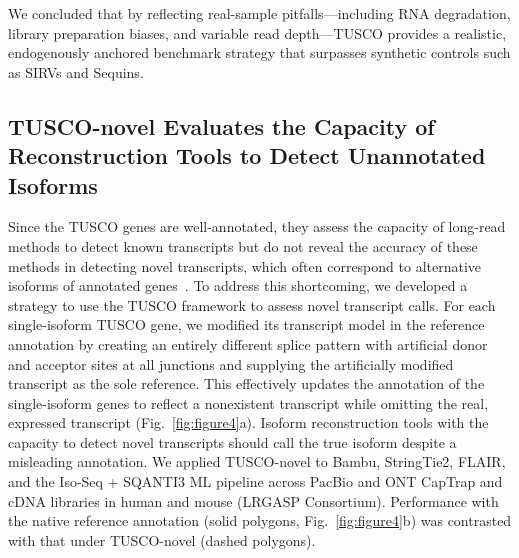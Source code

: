 \documentclass[pdflatex,sn-nature]{sn-jnl}%
\begin{document}
We concluded that by reflecting real-sample pitfalls---including RNA degradation, library preparation biases, and variable read depth---TUSCO provides a realistic, endogenously anchored benchmark strategy that surpasses synthetic controls such as SIRVs and Sequins.

\subsection{TUSCO-novel Evaluates the Capacity of Reconstruction Tools to Detect Unannotated Isoforms}

Since the TUSCO genes are well-annotated, they assess the capacity of long-read methods to detect known transcripts but do not reveal the accuracy of these methods in detecting novel transcripts, which often correspond to alternative isoforms of annotated genes~\cite{Wang2008Alternative,Pan2008Deep,Su2024Comprehensive}. To address this shortcoming, we developed a strategy to use the TUSCO framework to assess novel transcript calls. For each single-isoform TUSCO gene, we modified its transcript model in the reference annotation by creating an entirely different splice pattern with artificial donor and acceptor sites at all junctions and supplying the artificially modified transcript as the sole reference. This effectively updates the annotation of the single-isoform genes to reflect a nonexistent transcript while omitting the real, expressed transcript (Fig.~\ref{fig:figure4}a). Isoform reconstruction tools with the capacity to detect novel transcripts should call the true isoform despite a misleading annotation. We applied TUSCO-novel to Bambu, StringTie2, FLAIR, and the Iso-Seq + SQANTI3 ML pipeline across PacBio and ONT CapTrap and cDNA libraries in human and mouse (LRGASP Consortium). Performance with the native reference annotation (solid polygons, Fig.~\ref{fig:figure4}b) was contrasted with that under TUSCO-novel (dashed polygons).
\end{document}
